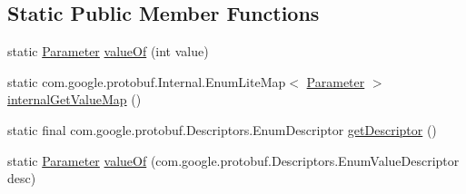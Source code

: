 \subsection*{Static Public Member Functions}
\begin{DoxyCompactItemize}
\item 
static \mbox{\hyperlink{enumcom_1_1mysql_1_1cj_1_1x_1_1protobuf_1_1_mysqlx_notice_1_1_session_state_changed_1_1_parameter}{Parameter}} \mbox{\hyperlink{enumcom_1_1mysql_1_1cj_1_1x_1_1protobuf_1_1_mysqlx_notice_1_1_session_state_changed_1_1_parameter_ac6dfd09c95230c71377b22f505ef2017}{value\+Of}} (int value)
\item 
static com.\+google.\+protobuf.\+Internal.\+Enum\+Lite\+Map$<$ \mbox{\hyperlink{enumcom_1_1mysql_1_1cj_1_1x_1_1protobuf_1_1_mysqlx_notice_1_1_session_state_changed_1_1_parameter}{Parameter}} $>$ \mbox{\hyperlink{enumcom_1_1mysql_1_1cj_1_1x_1_1protobuf_1_1_mysqlx_notice_1_1_session_state_changed_1_1_parameter_ad48b19c2d5d0e57235097af47ed68941}{internal\+Get\+Value\+Map}} ()
\item 
static final com.\+google.\+protobuf.\+Descriptors.\+Enum\+Descriptor \mbox{\hyperlink{enumcom_1_1mysql_1_1cj_1_1x_1_1protobuf_1_1_mysqlx_notice_1_1_session_state_changed_1_1_parameter_a4b112d5d7eaef504d4b3349e2f4b4c81}{get\+Descriptor}} ()
\item 
static \mbox{\hyperlink{enumcom_1_1mysql_1_1cj_1_1x_1_1protobuf_1_1_mysqlx_notice_1_1_session_state_changed_1_1_parameter}{Parameter}} \mbox{\hyperlink{enumcom_1_1mysql_1_1cj_1_1x_1_1protobuf_1_1_mysqlx_notice_1_1_session_state_changed_1_1_parameter_adfe85a99429acd684420766bdd607a84}{value\+Of}} (com.\+google.\+protobuf.\+Descriptors.\+Enum\+Value\+Descriptor desc)
\end{DoxyCompactItemize}

